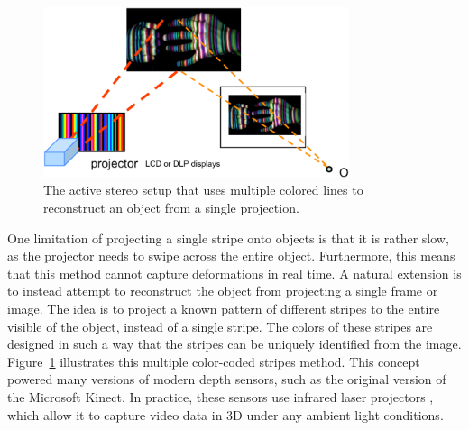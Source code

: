 \documentclass[a4paper, 12pt]{article}
\numberwithin{equation}{section}
\begin{document}
\begin{figure}[h!]
    \centering
    \includegraphics[width = 0.8\textwidth]{figures/active_multicolor_setup.png}
    \caption{The active stereo setup that uses multiple colored lines to reconstruct an object from a single projection.}
    \label{fig:active_multicolor_setup}
\end{figure}

One limitation of projecting a single stripe onto objects is that it is rather slow, as the projector needs to swipe across the entire object. Furthermore, this means that this method cannot capture deformations in real time. A natural extension is to instead attempt to reconstruct the object from projecting a single frame or image. The idea is to project a known pattern of different stripes to the entire visible of the object, instead of a single stripe. The colors of these stripes are designed in such a way that the stripes can be uniquely identified from the image. Figure~\ref{fig:active_multicolor_setup} illustrates this multiple color-coded stripes method. This concept powered many versions of modern depth sensors, such as the original version of the Microsoft Kinect. In practice, these sensors use infrared laser projectors , which  allow it to capture video data in 3D under any ambient light conditions. 
\end{document}
